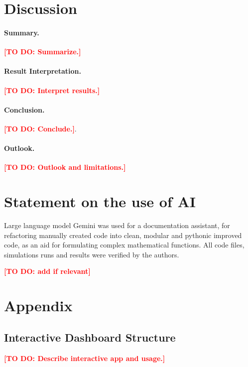 \documentclass[a4paper,11pt]{scrartcl}
\DeclareRobustCommand{\todo}[1]{\textcolor{red}{\textbf{[TO DO: #1]}}}
\begin{document}
\section{Discussion}

\paragraph{Summary.}
\todo{Summarize.}

\paragraph{Result Interpretation.}
\todo{Interpret results.}

\paragraph{Conclusion.}
\todo{Conclude.}.

\paragraph{Outlook.}
\todo{Outlook and limitations.}

\section{Statement on the use of AI}
Large language model Gemini was used for a documentation assistant, for refactoring manually created code into clean, modular and pythonic improved code, as an aid for formulating complex mathematical functions. All code files, simulations runs and results were verified by the authors.



\todo{add if relevant}

\newpage

\appendix
\section{Appendix}
\subsection{Interactive Dashboard Structure}
\todo{Describe interactive app and usage.}
\end{document}
